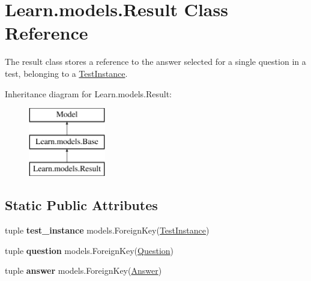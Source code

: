 \hypertarget{class_learn_1_1models_1_1_result}{\section{Learn.\-models.\-Result Class Reference}
\label{class_learn_1_1models_1_1_result}
}


The result class stores a reference to the answer selected for a single question in a test, belonging to a \hyperlink{class_learn_1_1models_1_1_test_instance}{Test\-Instance}.  


Inheritance diagram for Learn.\-models.\-Result\-:\begin{figure}[H]
\begin{center}
\leavevmode
\includegraphics[height=3.000000cm]{class_learn_1_1models_1_1_result}
\end{center}
\end{figure}
\subsection*{Static Public Attributes}
\begin{DoxyCompactItemize}
\item 
\hypertarget{class_learn_1_1models_1_1_result_a94edab0375399fb6ed6d5987815589dc}{tuple {\bfseries test\-\_\-instance} models.\-Foreign\-Key(\hyperlink{class_learn_1_1models_1_1_test_instance}{Test\-Instance})}\label{class_learn_1_1models_1_1_result_a94edab0375399fb6ed6d5987815589dc}

\item 
\hypertarget{class_learn_1_1models_1_1_result_a22b220ee0d27909efb470049c3d642af}{tuple {\bfseries question} models.\-Foreign\-Key(\hyperlink{class_learn_1_1models_1_1_question}{Question})}\label{class_learn_1_1models_1_1_result_a22b220ee0d27909efb470049c3d642af}

\item 
\hypertarget{class_learn_1_1models_1_1_result_aab5cdf32ea6736df41d96f7eb33baca7}{tuple {\bfseries answer} models.\-Foreign\-Key(\hyperlink{class_learn_1_1models_1_1_answer}{Answer})}\label{class_learn_1_1models_1_1_result_aab5cdf32ea6736df41d96f7eb33baca7}

\end{DoxyCompactItemize}

